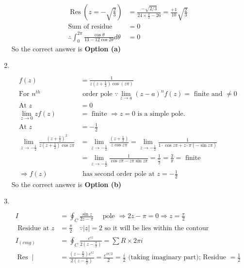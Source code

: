 \begin{enumerate}
\begin{answer}
\begin{align*}
	\operatorname{Res}\left(z=-\sqrt{\frac{2}{3}}\right)&=\frac{-\sqrt{2 / 3}}{24 \times \frac{2}{3}-26}=\frac{+1}{10} \sqrt{\frac{2}{3}}\\
	\text{Sum of residue }&=0\\
	\therefore \int_{0}^{2 \pi} \frac{\cos \theta}{13-12 \cos 2 \theta} d \theta&=0
	\end{align*}
	So the correct answer is \textbf{Option (a)}
\end{answer}
\item $\left. \right. $
\begin{answer}
	\begin{align*}
	f(z)&=\frac{1}{z\left(z+\frac{1}{2}\right) \cos (z \pi)}\\
	\text{For }n^{t h}&\text{ order pole $\because \lim _{z \rightarrow a}(z-a)^{n} f(z)=$ finite and $\neq 0$}\\
	\text{At }z&=0\\
	\lim _{z \rightarrow 0} z f(z)&=\text{ finite }\Rightarrow z=0\text{ is a simple pole.}\\
	\text{At }z&=-\frac{1}{2}\\
	\lim _{z \rightarrow-\frac{1}{2}} \frac{\left(z+\frac{1}{2}\right)^{2}}{z\left(z+\frac{1}{2}\right) \cos z \pi}&=\lim _{z \rightarrow-\frac{1}{2}} \frac{\left(z+\frac{1}{2}\right)}{z \cos z \pi}=\lim _{z \rightarrow-\frac{1}{2}} \frac{1}{1 \cdot \cos z \pi+z \cdot \pi(-\sin z \pi)}\\
	&=\lim _{z \rightarrow-\frac{1}{2}} \frac{1}{\cos z \pi-z \pi \sin z \pi}=\frac{1}{\frac{\pi}{2}}=\frac{2}{\pi}=\text{ finite}\\
	\Rightarrow f(z)&\text{ has second order pole at }z=-\frac{1}{2}
	\end{align*}
	So the correct answer is \textbf{Option (b)}
\end{answer}
\item $\left. \right. $
\begin{answer}
	\begin{align*}
	I&=\oint_{C} \frac{\sin z}{2 z-\pi} \quad\text{ pole }\Rightarrow 2 z-\pi=0 \Rightarrow z=\frac{\pi}{2}\\
	\text{	Residue at }z&=\frac{\pi}{2} \quad \because|z|=2\text{ so it will be lies within the contour}\\
	I_{(e m g)}&=\oint_{C} \frac{e^{i z}}{2\left(z-\frac{\pi}{2}\right)}=\sum R \times 2 \pi i\\
	\operatorname{Res} \mid&=\frac{\left(z-\frac{\pi}{2}\right) e^{i z}}{2\left(z-\frac{\pi}{2}\right)}=\frac{e^{i \pi / 2}}{2}=\frac{i}{2}\text{ (taking imaginary part); Residue $=\frac{1}{2}$}\\

\end{align*}
\end{answer}
\end{enumerate}

